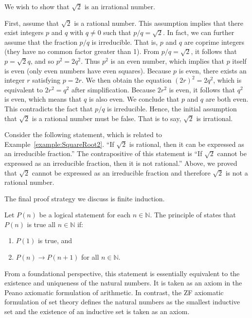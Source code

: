 \begin{example} \label{example:SquareRoot2}
We wish to show that $\sqrt{2}$ is an irrational number.

First, assume that $\sqrt{2}$ is a rational number.
This assumption implies that there exist integers $p$ and $q$ with $q \neq 0$ such that $p/q = \sqrt{2}$.
In fact, we can further assume that the fraction $p/q$ is irreducible.
That is, $p$ and $q$ are coprime integers (they have no common factor greater than 1).
From $p/q = \sqrt{2}$, it follows that $p = \sqrt{2} q$, and so $p^2 = 2 q^2$.
Thus $p^2$ is an even number, which implies that $p$ itself is even (only even numbers have even squares).
Because $p$ is even, there exists an integer $r$ satisfying $p = 2r$.
We then obtain the equation $(2r)^2 = 2q^2$, which is equivalent to $2r^2 = q^2$ after simplification.
Because $2r^2$ is even, it follows that $q^2$ is even, which means that $q$ is also even.
We conclude that $p$ and $q$ are both even.
This contradicts the fact that $p/q$ is irreducible.
Hence, the initial assumption that $\sqrt{2}$ is a rational number must be false.
That is to say, $\sqrt{2}$ is irrational.
\end{example}

\begin{example}
Consider the following statement, which is related to Example~\ref{example:SquareRoot2}.
``If $\sqrt{2}$ is rational, then it can be expressed as an irreducible fraction.''
The contrapositive of this statement is ``If $\sqrt{2}$ cannot be expressed as an irreducible fraction, then it is not rational.''
Above, we proved that $\sqrt{2}$ cannot be expressed as an irreducible fraction and therefore $\sqrt{2}$ is not a rational number.
\end{example}

The final proof strategy we discuss is finite induction.

\begin{definition}
Let $P(n)$ be a logical statement for each $n\in \mathbb{N}$.
The principle of  states that $P(n)$ is true all $n\in \mathbb{N}$ if:
\begin{enumerate}
\item $P(1)$ is true, and
\item $P(n)\to P(n+1)$ for all $n\in \mathbb{N}$.
\end{enumerate}
\end{definition}

From a foundational perspective, this statement is essentially equivalent to the existence and uniqueness of the natural numbers.
It is taken as an axiom in the Peano axiomatic formulation of arithmetic.
In contrast, the ZF axiomatic formulation of set theory defines the natural numbers as the smallest inductive set and the existence of an inductive set is taken as an axiom.

